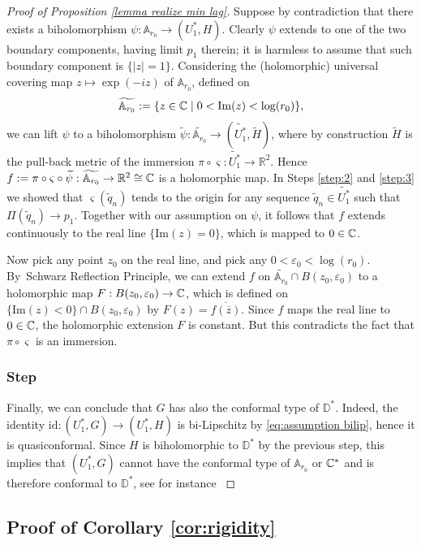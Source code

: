 \documentclass[11pt]{article}
\let\epsilon\varepsilon
\newcounter{steps}
\newcommand{\step}{\refstepcounter{steps}\subsubsection*{Step \thesteps}}
\theoremstyle{definition}
\newcommand{\R}{{\mathbb R}}
\begin{document}
\begin{proof}[Proof of Proposition \ref{lemma realize min lag}]
Suppose by contradiction that there exists a biholomorphism $\psi:\mathbb A_{r_0}\to (U_1^*,H)$. Clearly $\psi$ extends to one of the two boundary components, having limit $p_1$ therein; it is harmless to assume that such boundary component is $\{|z|=1\}$. Considering the (holomorphic) universal covering map $z\mapsto \exp({-iz})$ of $\mathbb A_{r_0}$, defined on
\begin{equation}\label{eq:univ cover annulus}
\widetilde{\mathbb A_{r_0}}:=\{z\in\C\mid0<\mathrm{Im}(z)<\log(r_0)\},
\end{equation}
we can lift $\psi$ to a biholomorphism $\widetilde\psi:\widetilde{\mathbb A_{r_0}}\to (\widetilde{U_1^*},\widetilde H)$, where by construction $\widetilde H$ is the pull-back metric of the immersion $\pi\circ\varsigma:\widetilde{U_1^*}\to\R^2$. Hence $f:=\pi\circ\varsigma\circ\widetilde\psi:\widetilde{\mathbb A_{r_0}}\to\R^2\cong \C$ is a holomorphic map. In Steps \ref{step:2} and \ref{step:3} we showed that $\varsigma(\widetilde q_n)$ tends to the origin for any sequence $\widetilde q_n\in \widetilde{U_1^*}$ such that $\Pi(\widetilde q_n)\to p_1$. Together with our assumption on $\psi$, it follows that $f$ extends continuously to the real line $\{\mathrm{Im}(z)=0\}$, which is mapped to $0\in{\mathbb C}$.

Now pick any point $z_0$ on the real line, and pick any $0<\epsilon_0<\log(r_0)$. By~Schwarz Reflection Principle, we can extend $f$ on $\widetilde{\mathbb A_{r_0}}\cap B(z_0,\epsilon_0)$ to a holomorphic map \hbox{$F:B(z_0,\epsilon_0)\to\C$}, which is defined on $\{\mathrm{Im}(z)<0\}\cap B(z_0,\epsilon_0)$ by $F(z)=\overline{f(\overline z)}$. Since $f$ maps the real line to $0\in {\mathbb C}$, the holomorphic extension $F$ is constant. But this contradicts the fact that $\pi\circ\varsigma$ is an immersion.

\step\label{step:6}
Finally, we can conclude that $G$ has also the conformal type of $\mathbb D^*$. Indeed, the identity $\mathrm{id}:(U_1^*,G)\to (U_1^*,H)$ is bi-Lipschitz by \eqref{eq:assumption bilip}, hence it is quasiconformal. Since $H$ is biholomorphic to $\mathbb D^*$ by the previous step, this implies that $(U_1^*,G)$ cannot have the conformal type of $\mathbb A_{r_0}$ or ${\mathbb C}^*$ and is therefore conformal to $\mathbb D^*$, see for instance \cite[\S 4.3]{zbMATH05042912}
\end{proof}

\subsection{Proof of Corollary \ref{cor:rigidity}}
\end{document}

